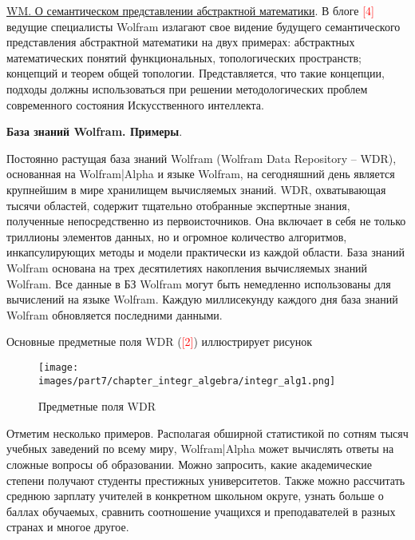 \underline{WM. О семантическом представлении абстрактной математики}. 
В блоге \textcolor{red}{[4]} ведущие специалисты Wolfram излагают свое видение будущего семантического представления абстрактной математики на двух примерах: абстрактных математических понятий функциональных, топологических пространств; концепций и теорем общей топологии. 
Представляется, что такие концепции, подходы должны использоваться при решении методологических проблем современного состояния Искусственного интеллекта. 

\textbf{
	База знаний Wolfram. Примеры}.

Постоянно растущая база знаний Wolfram (Wolfram
Data Repository -- WDR), основанная на Wolfram|Alpha и языке Wolfram, на сегодняшний день является крупнейшим в мире хранилищем вычисляемых знаний. 
WDR, охватывающая тысячи областей, содержит тщательно отобранные экспертные знания, полученные непосредственно из первоисточников. 
Она включает в себя не только триллионы элементов данных, но и огромное количество алгоритмов, инкапсулирующих методы и модели практически из каждой области.
База знаний Wolfram основана на трех десятилетиях накопления вычисляемых знаний Wolfram. Все данные в БЗ Wolfram могут быть немедленно использованы для вычислений на языке Wolfram. Каждую миллисекунду каждого дня база знаний Wolfram обновляется последними данными. 

Основные предметные поля WDR (\textcolor{red}{[2]}) иллюстрирует рисунок \textit{} 
\begin{figure}[h]
	\centering
	\texttt{[image: images/part7/chapter\_integr\_algebra/integr\_alg1.png]}
	\caption{Предметные поля WDR}
	\label{fig:integr_alg1}
\end{figure}


Отметим несколько примеров. Располагая обширной статистикой по сотням тысяч учебных заведений по всему миру, Wolfram|Alpha может вычислять ответы на сложные вопросы об образовании.
Можно запросить, какие академические степени получают студенты престижных университетов. 
Также можно рассчитать среднюю зарплату учителей в конкретном школьном округе, узнать больше о баллах обучаемых, сравнить соотношение учащихся и преподавателей в разных странах и многое другое.


